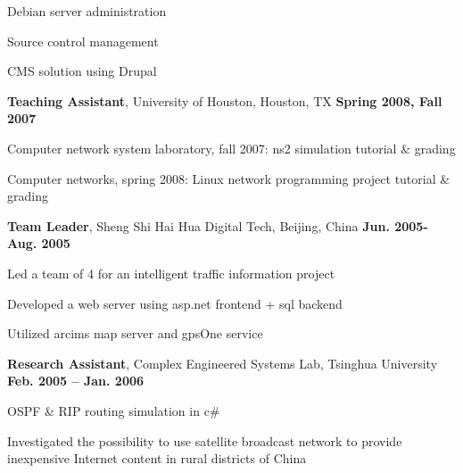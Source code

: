 \documentclass[overlapped, line]{resume}
\begin{document}
\begin{resume}
\begin{list2}
           \begin{list2}
           \item Debian server administration
           \item Source control management
           \item CMS solution using Drupal
           \end{list2}
         \end{list2}  \vspace{-5pt}
         \clearpage
         {\bf Teaching Assistant}, University of Houston, Houston, TX \hfill {\bf Spring 2008, Fall 2007}\\
         \vspace{-10pt}      %
         \begin{list2}
         \item Computer network system laboratory, fall 2007: ns2 simulation tutorial \& grading
         \item Computer networks, spring 2008: Linux network programming project tutorial \& grading
         \end{list2}  \vspace{-5pt}

         {\bf Team Leader}, Sheng Shi Hai Hua Digital Tech, Beijing, China \hfill {\bf Jun. 2005-Aug. 2005}\\
         \vspace{-10pt}      %
         \begin{list2}
         \item Led a team of 4 for an intelligent traffic information project
         \item Developed a web server using asp.net frontend + sql backend
         \item Utilized arcims map server and gpsOne service
         \end{list2}  \vspace{-5pt}

         {\bf Research Assistant}, Complex Engineered Systems Lab, Tsinghua University \hfill {\bf Feb. 2005 -- Jan. 2006}\\
         \vspace{-10pt}      %
         \begin{list2}
         \item OSPF \& RIP routing simulation in c\#
         \item Investigated the possibility to use satellite broadcast network to provide inexpensive Internet content in rural districts of China
         \end{list2}  \vspace{-5pt}


\end{resume}
\end{document}
